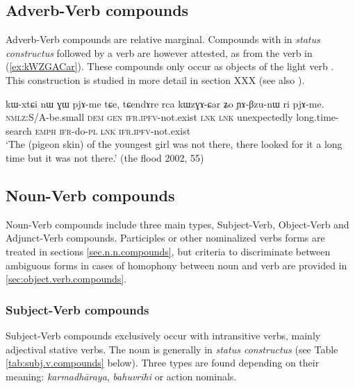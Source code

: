 \subsection{Adverb-Verb compounds} \label{sec.adv.v.compounds}
Adverb-Verb compounds are relative marginal. Compounds with  in \textit{status constructus}  followed by a verb are however attested, as  from the verb  in (\ref{ex:kWZGACar}). These compounds only occur as objects of the light verb . This construction is studied in more detail in section XXX (see also \citealt[252]{jacques16complementation}).

\begin{exe}
\ex \label{ex:kWZGACar}
\gll kɯ-xtɕi nɯ ɣɯ pjɤ-me tɕe, tɕendɤre rca kɯzɣɤ-ɕar ʑo ɲɤ-βzu-nɯ ri pjɤ-me.\\
\textsc{nmlz}:S/A-be.small \textsc{dem} \textsc{gen} \textsc{ifr}.\textsc{ipfv}-not.exist \textsc{lnk} \textsc{lnk} unexpectedly long.time-search \textsc{emph} \textsc{ifr}-do-\textsc{pl}  \textsc{lnk} \textsc{ifr}.\textsc{ipfv}-not.exist \\
\glt `The (pigeon skin) of the youngest girl was not there, there looked for it a long time but it was not there.' (the flood 2002, 55)
\end{exe}

\subsection{Noun-Verb compounds} \label{sec.n.v.compounds}
Noun-Verb compounds include three main types, Subject-Verb, Object-Verb and Adjunct-Verb compounds. Participles or other nominalized verbs forms are treated in sections \ref{sec.n.n.compounds}, but criteria to discriminate between ambiguous forms in cases of homophony between noun and verb are provided in \ref{sec:object.verb.compounds}.

\subsubsection{Subject-Verb compounds} \label{sec:subject.verb.compounds}
Subject-Verb compounds exclusively occur with intransitive verbs, mainly adjectival stative verbs. The noun is generally in \textit{status constructus} (see Table \ref{tab:subj.v.compounds} below). Three types are found depending on their meaning: \textit{karmadhāraya}, \textit{bahuvrīhi} or action nominals.

